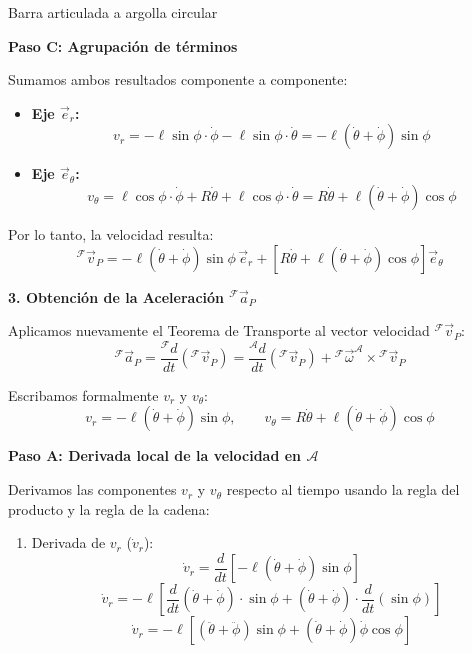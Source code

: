 \begin{solucion}{Barra articulada a argolla circular}
\vspace{0.3cm}

\noindent\textbf{Paso C: Agrupación de términos}

Sumamos ambos resultados componente a componente:
\begin{itemize}
    \item \textbf{Eje $\vec{e}_r$:}
    \[
    v_r = -\ell\sin\phi \cdot \dot{\phi} - \ell\sin\phi \cdot \dot{\theta} = -\ell(\dot{\theta} + \dot{\phi})\sin\phi
    \]
    \item \textbf{Eje $\vec{e}_\theta$:}
    \[
    v_\theta = \ell\cos\phi \cdot \dot{\phi} + R\dot{\theta} + \ell\cos\phi \cdot \dot{\theta} = R\dot{\theta} + \ell(\dot{\theta} + \dot{\phi})\cos\phi
    \]
\end{itemize}

Por lo tanto, la velocidad resulta:
\[
{}^{\mathcal{F}}\vec{v}_P = -\ell(\dot{\theta} + \dot{\phi})\sin\phi\,\vec{e}_r + \left[ R\dot{\theta} + \ell(\dot{\theta} + \dot{\phi})\cos\phi \right]\vec{e}_\theta
\]

\vspace{0.5cm}

\noindent\textbf{3. Obtención de la Aceleración ${}^{\mathcal{F}}\vec{a}_P$}

Aplicamos nuevamente el Teorema de Transporte al vector velocidad ${}^{\mathcal{F}}\vec{v}_P$:
\[
{}^{\mathcal{F}}\vec{a}_P = \frac{{}^{\mathcal{F}}d}{dt}({}^{\mathcal{F}}\vec{v}_P) = \frac{{}^{\mathcal{A}}d}{dt}({}^{\mathcal{F}}\vec{v}_P) + {}^{\mathcal{F}}\vec{\omega}^{\mathcal{A}} \times {}^{\mathcal{F}}\vec{v}_P
\]

Escribamos formalmente $v_r$ y $v_\theta$:
\[
v_r = -\ell(\dot{\theta} + \dot{\phi})\sin\phi, \qquad v_\theta = R\dot{\theta} + \ell(\dot{\theta} + \dot{\phi})\cos\phi
\]

\vspace{0.3cm}

\noindent\textbf{Paso A: Derivada local de la velocidad en $\mathcal{A}$}

Derivamos las componentes $v_r$ y $v_\theta$ respecto al tiempo usando la regla del producto y la regla de la cadena:
\begin{enumerate}
    \item Derivada de $v_r$ ($\dot{v}_r$):
    \[
    \dot{v}_r = \frac{d}{dt} \left[ -\ell(\dot{\theta} + \dot{\phi})\sin\phi \right]
    \]
    \[
    \dot{v}_r = -\ell \left[ \frac{d}{dt}(\dot{\theta} + \dot{\phi}) \cdot \sin\phi + (\dot{\theta} + \dot{\phi}) \cdot \frac{d}{dt}(\sin\phi) \right]
    \]
    \[
    \dot{v}_r = -\ell \left[ (\ddot{\theta} + \ddot{\phi})\sin\phi + (\dot{\theta} + \dot{\phi})\dot{\phi}\cos\phi \right]
    \]


\end{enumerate}
\end{solucion}
